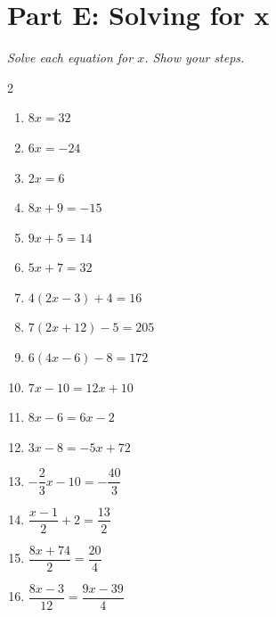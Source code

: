 \documentclass[11pt]{article}
\begin{document}
\section*{Part E: Solving for x}
\noindent\textit{Solve each equation for $x$. Show your steps.}
\begin{multicols}{2}
\begin{enumerate}
  \item $8x = 32$
  \vspace{2.0cm}
  \item $6x = -24$
  \vspace{2.0cm}
  \item $2x = 6$
  \vspace{2.0cm}
  \item $8x + 9 = -15$
  \vspace{2.0cm}
  \item $9x + 5 = 14$
  \vspace{2.0cm}
  \item $5x + 7 = 32$
  \vspace{2.0cm}
  \item $4(2x - 3) + 4 = 16$
  \vspace{2.0cm}
  \item $7(2x + 12) - 5 = 205$
  \vspace{2.0cm}
  \item $6(4x - 6) - 8 = 172$
  \vspace{2.0cm}
  \item $7x - 10 = 12x + 10$
  \vspace{2.0cm}
  \item $8x - 6 = 6x - 2$
  \vspace{2.0cm}
  \item $3x - 8 = -5x + 72$
  \vspace{2.0cm}
  \item $-\dfrac{2}{3}x - 10 = -\dfrac{40}{3}$
  \vspace{2.0cm}
  \item $\dfrac{x - 1}{2} + 2 = \dfrac{13}{2}$
  \vspace{2.0cm}
  \item $\dfrac{8x + 74}{2} = \dfrac{20}{4}$
  \vspace{2.0cm}
  \item $\dfrac{8x - 3}{12} = \dfrac{9x - 39}{4}$
  \vspace{2.0cm}
\end{enumerate}
\end{multicols}
\end{document}
